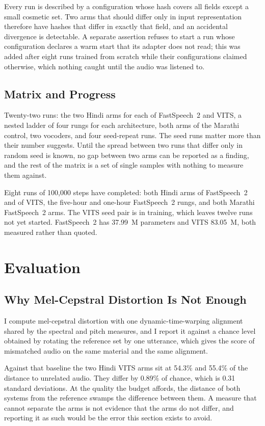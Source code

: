\documentclass[runningheads]{llncs}
\begin{document}
Every run is described by a configuration whose hash covers all fields except
a small cosmetic set. Two arms that should differ only in input representation
therefore have hashes that differ in exactly that field, and an accidental
divergence is detectable. A separate assertion refuses to start a run whose
configuration declares a warm start that its adapter does not read; this was
added after eight runs trained from scratch while their configurations claimed
otherwise, which nothing caught until the audio was listened to.

\subsection{Matrix and Progress}

Twenty-two runs: the two Hindi arms for each of FastSpeech~2 and VITS, a
nested ladder of four rungs for each architecture, both arms of the Marathi
control, two vocoders, and four seed-repeat runs. The seed runs matter more
than their number suggests. Until the spread between two runs that differ only
in random seed is known, no gap between two arms can be reported as a finding,
and the rest of the matrix is a set of single samples with nothing to measure
them against.

Eight runs of 100{,}000 steps have completed: both Hindi arms of FastSpeech~2
and of VITS, the five-hour and one-hour FastSpeech~2 rungs, and both Marathi
FastSpeech~2 arms. The VITS seed pair is in training, which leaves twelve runs
not yet started.
FastSpeech~2 has 37.99~M parameters and VITS 83.05~M, both measured rather
than quoted.

\section{Evaluation}

\subsection{Why Mel-Cepstral Distortion Is Not Enough}
\label{sec:mcd}

I compute mel-cepstral distortion with one dynamic-time-warping alignment
shared by the spectral and pitch measures, and I report it against a chance
level obtained by rotating the reference set by one utterance, which gives the
score of mismatched audio on the same material and the same alignment.

Against that baseline the two Hindi VITS arms sit at 54.3\% and 55.4\% of the
distance to unrelated audio. They differ by 0.89\% of chance, which is 0.31
standard deviations. At the quality the budget affords, the distance of both
systems from the reference swamps the difference between them. A measure that
cannot separate the arms is not evidence that the arms do not differ, and
reporting it as such would be the error this section exists to avoid.
\end{document}
